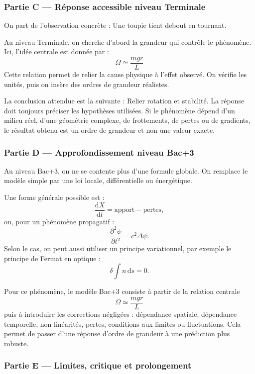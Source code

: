 \documentclass[11pt,a4paper]{article}
\begin{document}
\subsubsection*{Partie C — Réponse accessible niveau Terminale}

\begin{corrigebox}
On part de l'observation concrète : Une toupie tient debout en tournant.

Au niveau Terminale, on cherche d'abord la grandeur qui contrôle le phénomène. Ici, l'idée centrale est donnée par :
\[
\Omega\simeq\frac{mgr}{L}
\]
Cette relation permet de relier la cause physique à l'effet observé. On vérifie les unités, puis on insère des ordres de grandeur réalistes.

La conclusion attendue est la suivante : Relier rotation et stabilité. La réponse doit toujours préciser les hypothèses utilisées. Si le phénomène dépend d'un milieu réel, d'une géométrie complexe, de frottements, de pertes ou de gradients, le résultat obtenu est un ordre de grandeur et non une valeur exacte.
\end{corrigebox}

\subsubsection*{Partie D — Approfondissement niveau Bac+3}

\begin{approfondissementbox}
Au niveau Bac+3, on ne se contente plus d'une formule globale. On remplace le modèle simple par une loi locale, différentielle ou énergétique.

Une forme générale possible est :
\[
\frac{\mathrm d X}{\mathrm dt}=\text{apport}-\text{pertes},
\]
ou, pour un phénomène propagatif :
\[
\frac{\partial^2 \psi}{\partial t^2}=c^2\Delta\psi.
\]
Selon le cas, on peut aussi utiliser un principe variationnel, par exemple le principe de Fermat en optique :
\[
\delta \int n\,\mathrm ds=0.
\]

Pour ce phénomène, le modèle Bac+3 consiste à partir de la relation centrale
\[
\Omega\simeq\frac{mgr}{L}
\]
puis à introduire les corrections négligées : dépendance spatiale, dépendance temporelle, non-linéarités, pertes, conditions aux limites ou fluctuations. Cela permet de passer d'une réponse d'ordre de grandeur à une prédiction plus robuste.
\end{approfondissementbox}

\subsubsection*{Partie E — Limites, critique et prolongement}
\end{document}
